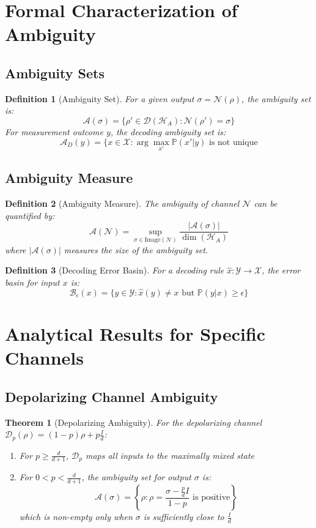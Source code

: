 \documentclass[12pt]{article}
\newtheorem{theorem}{Theorem}
\newtheorem{definition}{Definition}
\begin{document}
\section{Formal Characterization of Ambiguity}

\subsection{Ambiguity Sets}
\begin{definition}[Ambiguity Set]
For a given output $\sigma = \mathcal{N}(\rho)$, the ambiguity set is:
\[
\mathcal{A}(\sigma) = \{\rho' \in \mathcal{D}(\mathcal{H}_A) : \mathcal{N}(\rho') = \sigma\}
\]
For measurement outcome $y$, the decoding ambiguity set is:
\[
\mathcal{A}_D(y) = \{x \in \mathcal{X} : \arg\max_{x'} \mathbb{P}(x'|y) \text{ is not unique}\]
\end{definition}

\subsection{Ambiguity Measure}
\begin{definition}[Ambiguity Measure]
The ambiguity of channel $\mathcal{N}$ can be quantified by:
\[
\mathcal{A}(\mathcal{N}) = \sup_{\sigma \in \text{Image}(\mathcal{N})} \frac{|\mathcal{A}(\sigma)|}{\dim(\mathcal{H}_A)}
\]
where $|\mathcal{A}(\sigma)|$ measures the size of the ambiguity set.
\end{definition}

\begin{definition}[Decoding Error Basin]
For a decoding rule $\hat{x}: \mathcal{Y} \to \mathcal{X}$, the error basin for input $x$ is:
\[
\mathcal{B}_\epsilon(x) = \{y \in \mathcal{Y} : \hat{x}(y) \neq x \text{ but } \mathbb{P}(y|x) \geq \epsilon\}
\]
\end{definition}

\section{Analytical Results for Specific Channels}

\subsection{Depolarizing Channel Ambiguity}
\begin{theorem}[Depolarizing Ambiguity]
For the depolarizing channel $\mathcal{D}_p(\rho) = (1-p)\rho + p\frac{I}{d}$:
\begin{enumerate}
    \item For $p \geq \frac{d}{d+1}$, $\mathcal{D}_p$ maps all inputs to the maximally mixed state
    \item For $0 < p < \frac{d}{d+1}$, the ambiguity set for output $\sigma$ is:
    \[
    \mathcal{A}(\sigma) = \left\{\rho : \rho = \frac{\sigma - \frac{p}{d}I}{1-p} \text{ is positive}\right\}
    \]
    which is non-empty only when $\sigma$ is sufficiently close to $\frac{I}{d}$
\end{enumerate}
\end{theorem}
\end{document}
